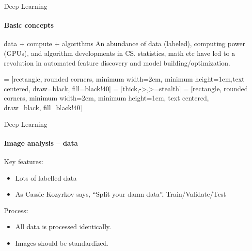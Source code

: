 \documentclass{beamer}
\begin{document}
\begin{darkframes}
    \begin{frame}{Deep Learning}
      \framesubtitle{Basic concepts}
      \begin{block}
      {data + compute + algorithms}
        An abundance of data (labeled), computing power (GPUs), and algorithm developments in CS, statistics, math etc have led to a revolution in automated feature discovery and model building/optimization.
      \end{block}
      \bigskip
         = [rectangle, rounded corners, minimum width=2cm, minimum height=1cm,text centered, draw=black, fill=black!40]
         = [thick,->,>=stealth]
         = [rectangle, rounded corners, minimum width=2cm, minimum height=1cm, text centered, draw=black, fill=black!40]
      
    \end{frame}
    
    
    \begin{frame}{Deep Learning}
      \framesubtitle{Image analysis -- data}
      \begin{block}
      {\small{Key features:}}
      \begin{itemize}
          \item Lots of labelled data
          \item As Cassie Kozyrkov says, “Split your damn data”.  Train/Validate/Test
      \end{itemize}
      \end{block}
      \bigskip
      \begin{block}
      {\small{Process:}}
      \begin{itemize}
          \item All data is processed identically.
          \item Images should be standardized.
      \end{itemize}
      \end{block}
    \end{frame}
    

\end{darkframes}
\end{document}
